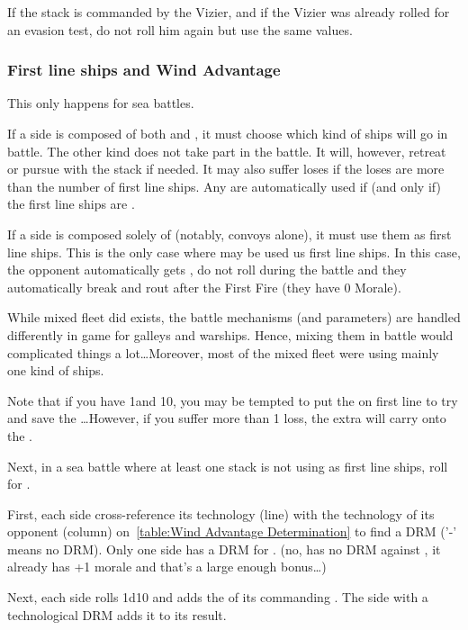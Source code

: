 If the stack is commanded by the \TUR Vizier, and if the Vizier was already
rolled for an evasion test, do not roll him again but use the same values.

\subsubsection{First line ships and Wind Advantage}
This only happens for sea battles.

If a side is composed of both \NGD and \NWD, it must choose which kind of
ships will go in battle. The other kind does not take part in the battle. It
will, however, retreat or pursue with the stack if needed. It may also suffer
loses if the loses are more than the number of first line ships. Any \VGD are
automatically used if (and only if) the first line ships are \NGD.

If a side is composed solely of \NTD (notably, convoys alone), it must use
them as first line ships. This is the only case where \NTD may be used us
first line ships. In this case, the opponent automatically gets , \NTD do not roll during the battle and they automatically break
and rout after the First Fire (they have 0 Morale).

\begin{designnote}
  While mixed fleet did exists, the battle mechanisms (and parameters) are
  handled differently in game for galleys and warships. Hence, mixing them in
  battle would complicated things a lot\ldots Moreover, most of the mixed
  fleet were using mainly one kind of ships.

  Note that if you have 1\NWD and 10\NGD, you may be tempted to put the \NWD
  on first line to try and save the \NGD\ldots However, if you suffer more
  than 1 loss, the extra will carry onto the \NGD.
\end{designnote}

Next, in a sea battle where at least one stack is not using \NGD as first line
ships, roll for .


First, each side cross-reference its technology (line) with the technology of
its opponent (column) on~\ref{table:Wind Advantage Determination} to find a
DRM ('-' means no DRM). Only one side has a DRM for .
(no, \TBAT has no DRM against \TGF, it already has +1 morale and that's a
large enough bonus\ldots)

Next, each side rolls 1d10 and adds the \Man of its commanding \LeaderA. The
side with a technological DRM adds it to its result.


